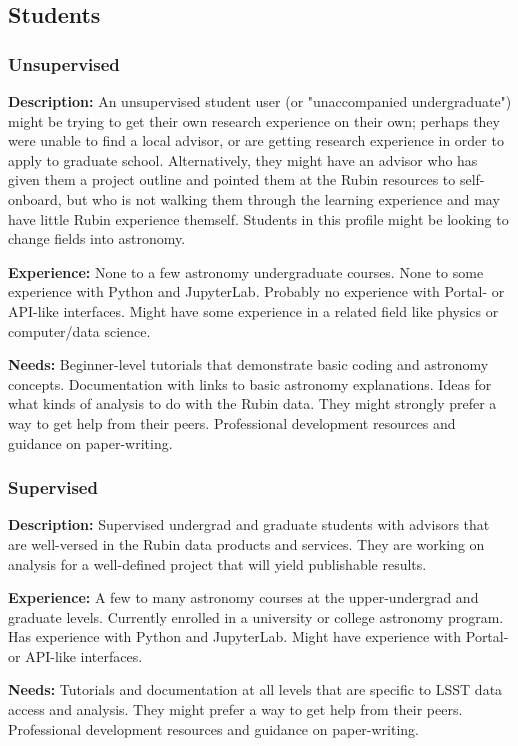 \subsection{Students}

\subsubsection{Unsupervised}

\textbf{Description:} 
An unsupervised student user (or "unaccompanied undergraduate") might be trying
to get their own research experience on their own; perhaps they were unable to find
a local advisor, or are getting research experience in order to apply to graduate school.
Alternatively, they might have an advisor who has given them a project outline and pointed
them at the Rubin resources to self-onboard, but who is not walking them through
the learning experience and may have little Rubin experience themself.
Students in this profile might be looking to change fields into astronomy.

\textbf{Experience:}
None to a few astronomy undergraduate courses.
None to some experience with Python and JupyterLab.
Probably no experience with Portal- or API-like interfaces.
Might have some experience in a related field like physics or computer/data science.

\textbf{Needs:}
Beginner-level tutorials that demonstrate basic coding and astronomy concepts.
Documentation with links to basic astronomy explanations.
Ideas for what kinds of analysis to do with the Rubin data.
They might strongly prefer a way to get help from their peers.
Professional development resources and guidance on paper-writing.

\subsubsection{Supervised}

\textbf{Description:} 
Supervised undergrad and graduate students with advisors that are well-versed
in the Rubin data products and services.
They are working on analysis for a well-defined project that will yield publishable results.

\textbf{Experience:} 
A few to many astronomy courses at the upper-undergrad and graduate levels.
Currently enrolled in a university or college astronomy program.
Has experience with Python and JupyterLab.
Might have experience with Portal- or API-like interfaces.

\textbf{Needs:}
Tutorials and documentation at all levels that are specific to LSST data access and analysis.
They might prefer a way to get help from their peers.
Professional development resources and guidance on paper-writing.

